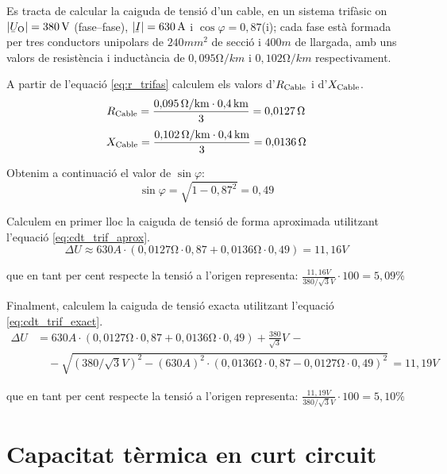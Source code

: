 \begin{exemple}
   Es tracta de calcular la caiguda de tensi\'{o} d'un cable, en un sistema trif\`{a}sic on $|\cmplx{U}\ped{O}| = 380\unit{V}$ (fase--fase), $|\cmplx{I}|=630\unit{A}$ i $\cos \varphi = 0{,}87$(i); cada fase est\`{a} formada per tres conductors unipolars de $240\unit{mm^2}$ de secci\'{o} i $400\unit{m}$ de llargada, amb uns valors de resist\`{e}ncia i induct\`{a}ncia de $0{,}095\unit{\ohm/km}$ i $0{,}102\unit{\ohm/km}$ respectivament.

A partir de l'equaci\'{o} \eqref{eq:r_trifas} calculem els valors d'$R_\mathrm{Cable}$ i d'$X_\mathrm{Cable}$.
\[
   R_\mathrm{Cable} = \frac{0{,}095\mathrm{\,\mathrm{\Omega}/km}\cdot 0{,}4\mathrm{\,km}}{3} = 0{,}0127\mathrm{\,\mathrm{\Omega}}
\]
\[
   X_\mathrm{Cable} = \frac{0{,}102\mathrm{\,\mathrm{\Omega}/km}\cdot 0{,}4\mathrm{\,km}}{3} = 0{,}0136\mathrm{\,\mathrm{\Omega}}
\]

Obtenim a continuaci\'{o} el valor de $\sin \varphi$:
\[
   \sin \varphi = \sqrt{1-0{,}87^2} = 0,49
\]

Calculem en primer lloc la caiguda de tensi\'{o} de forma aproximada utilitzant l'equaci\'{o} \eqref{eq:cdt_trif_aprox}.
\[
   \Delta U \approx 630\unit{A} \cdot ( 0{,}0127\unit{\ohm} \cdot 0{,}87 + 0{,}0136\unit{\ohm} \cdot 0{,}49 ) = 11{,}16\unit{V}
\]

que en tant per cent respecte la tensi\'{o} a l'origen representa:
$\frac{11{,}16\unit{V}}{380/\sqrt{3}\unit{V}} \cdot 100 = 5{,}09\unit{\%} $

Finalment, calculem la caiguda de tensi\'{o} exacta utilitzant l'equaci\'{o} \eqref{eq:cdt_trif_exact}.
\[ \begin{split}
   \Delta U &=  630\unit{A} \cdot ( 0{,}0127\unit{\ohm} \cdot 0{,}87 + 0{,}0136\unit{\ohm} \cdot 0{,}49 ) + \frac{380}{\sqrt{3}}\unit{V} \,- \\
    & \quad - \sqrt{(380/\sqrt{3}\unit{V})^2 - (630\unit{A})^2 \cdot ( 0{,}0136\unit{\ohm} \cdot 0{,}87 - 0{,}0127\unit{\ohm} \cdot 0{,}49 )^2 } \,= 11{,}19\unit{V}
\end{split} \]

que en tant per cent respecte la tensi\'{o} a l'origen representa:
$\frac{11{,}19\unit{V}}{380/\sqrt{3}\unit{V}} \cdot 100 = 5{,}10\unit{\%} $
\end{exemple}

\section{Capacitat t\`{e}rmica en curt circuit}

